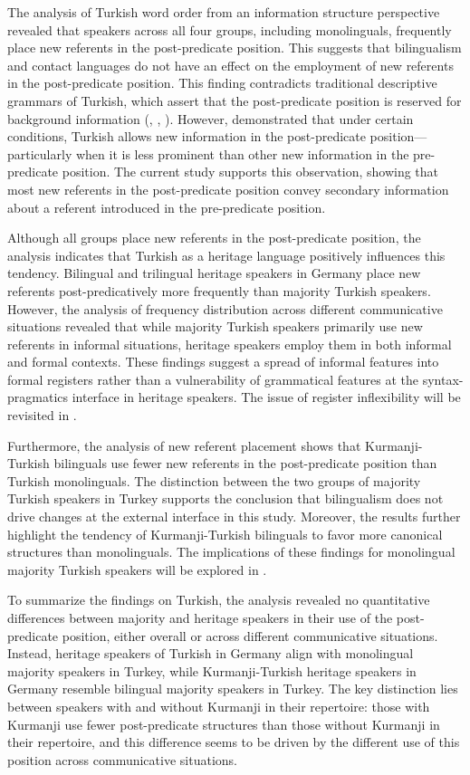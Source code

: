 The analysis of Turkish word order from an information structure perspective revealed that speakers across all four groups, including monolinguals, frequently place new referents in the post-predicate position. This suggests that bilingualism and contact languages do not have an effect on the employment of new referents in the post-predicate position. This finding contradicts traditional descriptive grammars of Turkish, which assert that the post-predicate position is reserved for background information (\citealt{Erguvanli1984}, \citealt{GokselÖzsoy2000}, \citealt{Issever2003}). However, \citet{DogruozBackus2007} demonstrated that under certain conditions, Turkish allows new information in the post-predicate position—particularly when it is less prominent than other new information in the pre-predicate position. The current study supports this observation, showing that most new referents in the post-predicate position convey secondary information about a referent introduced in the pre-predicate position.

Although all groups place new referents in the post-predicate position, the analysis indicates that Turkish as a heritage language positively influences this tendency. Bilingual and trilingual heritage speakers in Germany place new referents post-predicatively more frequently than majority Turkish speakers. However, the analysis of frequency distribution across different communicative situations revealed that while majority Turkish speakers primarily use new referents in informal situations, heritage speakers employ them in both informal and formal contexts. These findings suggest a spread of informal features into formal registers rather than a vulnerability of grammatical features at the syntax-pragmatics interface in heritage speakers. The issue of register inflexibility will be revisited in .

Furthermore, the analysis of new referent placement shows that Kurmanji-Turkish bilinguals use fewer new referents in the post-predicate position than Turkish monolinguals. The distinction between the two groups of majority Turkish speakers in Turkey supports the conclusion that bilingualism does not drive changes at the external interface in this study. Moreover, the results further highlight the tendency of Kurmanji-Turkish bilinguals to favor more canonical structures than monolinguals. The implications of these findings for monolingual majority Turkish speakers will be explored in .

To summarize the findings on Turkish, the analysis revealed no quantitative differences between majority and heritage speakers in their use of the post-predicate position, either overall or across different communicative situations. Instead, heritage speakers of Turkish in Germany align with monolingual majority speakers in Turkey, while Kurmanji-Turkish heritage speakers in Germany resemble bilingual majority speakers in Turkey. The key distinction lies between speakers with and without Kurmanji in their repertoire: those with Kurmanji use fewer post-predicate structures than those without Kurmanji in their repertoire, and this difference seems to be driven by the different use of this position across communicative situations.

